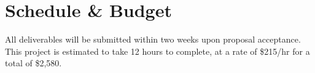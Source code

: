 \section{Schedule \& Budget}
All deliverables will be submitted within two weeks upon proposal acceptance.
This project is estimated to take 12 hours to complete, at a rate of \$215/hr for a total of \$2,580.

